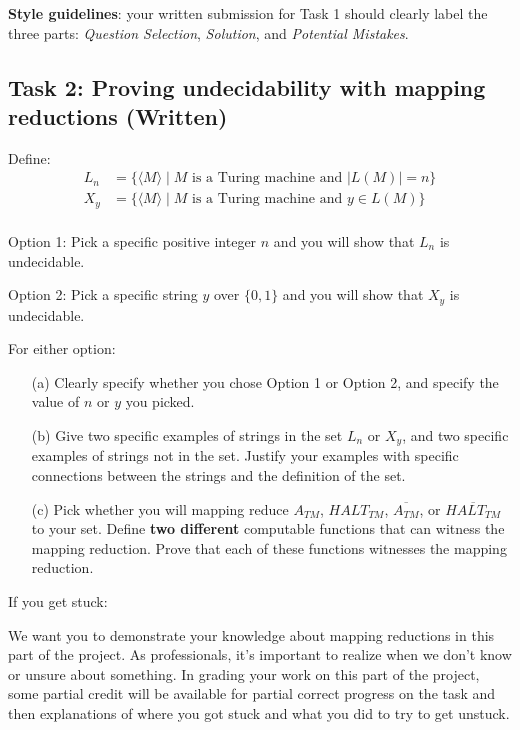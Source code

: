 	{\bf Style guidelines}: your written submission for Task 1 should clearly label the three parts:
	{\it Question Selection}, {\it Solution},  and {\it Potential Mistakes}.

\subsection*{Task 2: Proving undecidability with mapping reductions (Written)}

	Define:
	\begin{align*}
		L_n &= \{ \langle M \rangle \mid \textrm{$M$ is a Turing machine and } |L(M)| = n\} \\
		X_{y} & = \{ \langle M \rangle \mid \textrm{$M$ is a Turing machine and } y \in L(M)\} \\
	\end{align*}

	Option 1: Pick a specific positive integer $n$ and you will show that $L_n$ is undecidable.

	Option 2: Pick a specific string $y$ over $\{0,1\}$ and you will show that $X_y$ is undecidable.

	For either option:
	\begin{enumerate}
		\item[(a)] Clearly specify whether you chose Option 1 or Option 2, and specify the value of $n$ or $y$ you picked.
		\item[(b)] Give two specific examples of strings in the set $L_n$ or $X_y$, and two specific examples 
		of strings not in the set. Justify your examples with specific connections between the strings and the 
		definition of the set.
		\item[(c)] Pick whether you will mapping reduce $A_{TM}$, $HALT_{TM}$, $\overline{A_{TM}}$, or $\overline{HALT_{TM}}$
		to your set. Define {\bf two different} computable functions that can witness the mapping reduction.
		Prove that each of these functions witnesses the mapping reduction.
	\end{enumerate}

	If you get stuck:

	We want you to demonstrate your knowledge about mapping reductions in this part of the project.  
	As professionals, it's important to realize when we don't know or unsure about something.
	In grading your work on this part of the project, some partial credit will be available for 
	partial correct progress on the task and then explanations of where
	you got stuck and what you did to try to get unstuck.

